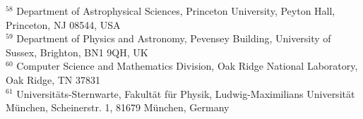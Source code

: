 \documentclass[fleqn,usenatbib]{mnras}
\begin{document}
{$^{58}$ Department of Astrophysical Sciences, Princeton University, Peyton Hall, Princeton, NJ 08544, USA\\
$^{59}$ Department of Physics and Astronomy, Pevensey Building, University of Sussex, Brighton, BN1 9QH, UK\\
$^{60}$ Computer Science and Mathematics Division, Oak Ridge National Laboratory, Oak Ridge, TN 37831\\
$^{61}$ Universit\"ats-Sternwarte, Fakult\"at f\"ur Physik, Ludwig-Maximilians Universit\"at M\"unchen, Scheinerstr. 1, 81679 M\"unchen, Germany\\
}


\bsp	%
\label{lastpage}
\end{document}
